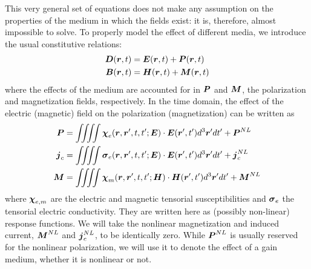 This very general set of equations does not make any assumption on the 
properties of the medium in which the fields exist: it is, therefore, 
almost impossible to solve. To properly model the effect of different media,
we introduce the usual constitutive relations:
  \begin{subequations}
  \begin{align}
    \boldsymbol{D}(\boldsymbol{r},t)	&= \boldsymbol{E}(\boldsymbol{r},t)+\boldsymbol{P}(\boldsymbol{r},t)	\\
    \boldsymbol{B}(\boldsymbol{r},t)	&= \boldsymbol{H}(\boldsymbol{r},t)+\boldsymbol{M}(\boldsymbol{r},t)	
  \end{align}
  \end{subequations}
where the effects of the medium are accounted for in $\boldsymbol{P}$
and $\boldsymbol{M}$, the polarization and magnetization fields, respectively.
In the time domain, the effect of the electric (magnetic) field on the polarization
(magnetization) can be written as
  \begin{subequations}
  \begin{align}
   \boldsymbol{P}	&= \iiiint \boldsymbol{\chi}_e(\boldsymbol{r}, \boldsymbol{r}',t, t'; \boldsymbol{E})\cdot\boldsymbol{E}(\boldsymbol{r}', t') d^3\boldsymbol{r}'dt' + \boldsymbol{P}^{NL}	\\
   \boldsymbol{j}_c	&= \iiiint \boldsymbol{\sigma}_e(\boldsymbol{r}, \boldsymbol{r}',t, t';\boldsymbol{E})\cdot\boldsymbol{E}(\boldsymbol{r}', t') d^3\boldsymbol{r}'dt'+ \boldsymbol{j}_c^{NL}			\\
   \boldsymbol{M}	&= \iiiint \boldsymbol{\chi}_m(\boldsymbol{r}, \boldsymbol{r}',t, t'; \boldsymbol{H})\cdot\boldsymbol{H}(\boldsymbol{r}', t') d^3\boldsymbol{r}'dt' + \boldsymbol{M}^{NL}
  \end{align}
  \end{subequations}
where $\boldsymbol{\chi}_{e,m}$ are the electric and magnetic tensorial susceptibilities and 
$\boldsymbol{\sigma}_e$ the tensorial electric conductivity. They 
are written here as (possibly non-linear) response functions. We will 
take the nonlinear magnetization and induced current, 
$\boldsymbol{M}^{NL}$ and $\boldsymbol{j}_c^{NL}$, to be identically zero. 
While $\boldsymbol{P}^{NL}$ is usually reserved for the nonlinear polarization, 
we will use it to denote the effect of a gain medium, whether it is 
nonlinear or not. 

